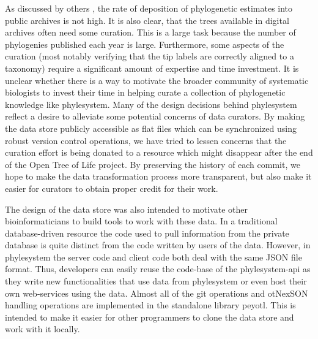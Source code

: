 \documentclass{bioinfo}
\newcommand{\ps}{phylesystem\xspace}
\newcommand{\otol}{Open Tree of Life\xspace}
\newcommand{\nexson}{otNexSON\xspace}
\begin{document}
As discussed by others \citep{DrewEtAl2013,MageeMM2014}, the rate of deposition of phylogenetic
    estimates into public archives is not high.
It is also clear, that the trees available in digital archives often need some curation.
This is a large task because the number of phylogenies published each year is large.
Furthermore, some aspects of the curation (most notably verifying that the tip labels are correctly
    aligned to a taxonomy) require a significant amount of expertise and time investment.
It is unclear whether there is a way to motivate the broader community of systematic biologists to
    invest their time in helping curate a collection of phylogenetic knowledge like \ps.
Many of the design decisions behind \ps reflect a desire to alleviate some potential concerns
    of data curators.
By making the data store publicly accessible as flat files which can be synchronized using robust
    version control operations, we have tried to lessen
    concerns that the curation effort is being donated to a resource which might disappear
    after the end of the \otol project.
By preserving the history of each commit, we hope to make the data transformation process more 
    transparent, but also make it easier for curators to obtain proper credit for their work.

The design of the data store was also intended to motivate other bioinformaticians to
    build tools to work with these data.
In a traditional database-driven resource the code used to pull information from the private
    database is quite distinct from the code written by users of the data.
However, in \ps the server code and client code both deal with the same JSON file format.
Thus, developers can easily reuse the code-base of the \ps-api as they write new functionalities
    that use data from \ps or even host their own web-services using the data.
Almost all of the git operations and \nexson handling operations are implemented in the standalone
    library peyotl.
This is intended to make it easier for other programmers to clone
    the data store and work with it locally.
\end{document}
